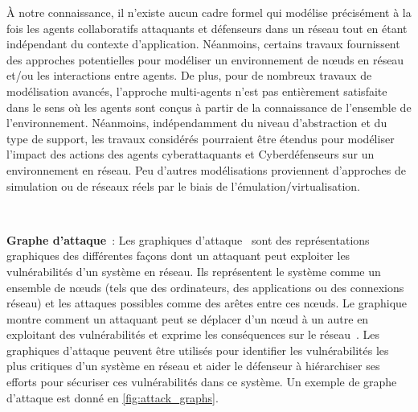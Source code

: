 À notre connaissance, il n'existe aucun cadre formel qui modélise précisément à la fois les agents collaboratifs attaquants et défenseurs dans un réseau tout en étant indépendant du contexte d'application.
Néanmoins, certains travaux fournissent des approches potentielles pour modéliser un environnement de nœuds en réseau et/ou les interactions entre agents.
De plus, pour de nombreux travaux de modélisation avancés, l'approche multi-agents n'est pas entièrement satisfaite dans le sens où les agents sont conçus à partir de la connaissance de l'ensemble de l'environnement.
Néanmoins, indépendamment du niveau d'abstraction et du type de support, les travaux considérés pourraient être étendus pour modéliser l'impact des actions des agents cyberattaquants et Cyberdéfenseurs sur un environnement en réseau.
Peu d'autres modélisations proviennent d'approches de simulation ou de réseaux réels par le biais de l'émulation/virtualisation.

\

\noindent
\textbf{Graphe d'attaque}~: \quad Les graphiques d'attaque~\cite{CPhilips1998} sont des représentations graphiques des différentes façons dont un attaquant peut exploiter les vulnérabilités d'un système en réseau. Ils représentent le système comme un ensemble de nœuds (tels que des ordinateurs, des applications ou des connexions réseau) et les attaques possibles comme des arêtes entre ces nœuds. Le graphique montre comment un attaquant peut se déplacer d'un nœud à un autre en exploitant des vulnérabilités et exprime les conséquences sur le réseau~\cite{CPhilips1998}.
Les graphiques d'attaque peuvent être utilisés pour identifier les vulnérabilités les plus critiques d'un système en réseau et aider le défenseur à hiérarchiser ses efforts pour sécuriser ces vulnérabilités dans ce système. Un exemple de graphe d'attaque est donné en \autoref{fig:attack_graphs}.

